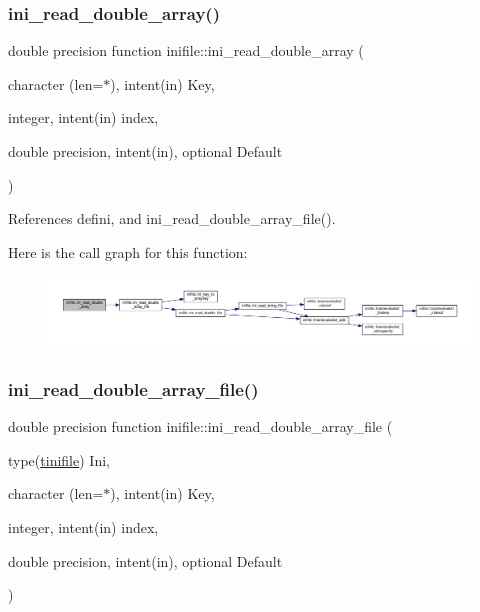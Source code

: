 \subsubsection{\texorpdfstring{ini\+\_\+read\+\_\+double\+\_\+array()}{ini\_read\_double\_array()}}
{\footnotesize\ttfamily double precision function inifile\+::ini\+\_\+read\+\_\+double\+\_\+array (\begin{DoxyParamCaption}\item[{character (len=$\ast$), intent(in)}]{Key,  }\item[{integer, intent(in)}]{index,  }\item[{double precision, intent(in), optional}]{Default }\end{DoxyParamCaption})}



References defini, and ini\+\_\+read\+\_\+double\+\_\+array\+\_\+file().

Here is the call graph for this function\+:
\nopagebreak
\begin{figure}[H]
\begin{center}
\leavevmode
\includegraphics[width=350pt]{namespaceinifile_a0144764d1230507cd08723c17424daea_cgraph}
\end{center}
\end{figure}
\mbox{\label{namespaceinifile_a0b015fcd4b5106643a5da8209d5d03d2}} 
\subsubsection{\texorpdfstring{ini\+\_\+read\+\_\+double\+\_\+array\+\_\+file()}{ini\_read\_double\_array\_file()}}
{\footnotesize\ttfamily double precision function inifile\+::ini\+\_\+read\+\_\+double\+\_\+array\+\_\+file (\begin{DoxyParamCaption}\item[{type(\mbox{\hyperlink{structinifile_1_1tinifile}{tinifile}})}]{Ini,  }\item[{character (len=$\ast$), intent(in)}]{Key,  }\item[{integer, intent(in)}]{index,  }\item[{double precision, intent(in), optional}]{Default }\end{DoxyParamCaption})}



